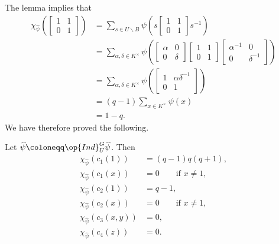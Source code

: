 \documentclass[../main.tex]{subfiles}
\begin{document}
The lemma implies that
\begin{align*}
	\chi_{\widehat\psi}\left(\begin{bmatrix}
		1 & 1 \\
		0 & 1
	\end{bmatrix}\right) &= \sum_{s\in U\backslash B}\psi\left(s\begin{bmatrix}
		1 & 1 \\
		0 & 1
	\end{bmatrix}s^{-1}\right) \\
	&= \sum_{\alpha,\delta\in K^\times}\psi\left(\begin{bmatrix}
		\alpha & 0 \\
		0 & \delta
	\end{bmatrix}\begin{bmatrix}
		1 & 1 \\
		0 & 1
	\end{bmatrix}\begin{bmatrix}
		\alpha^{-1} & 0 \\
		0 & \delta^{-1}
	\end{bmatrix}\right) \\
	&= \sum_{\alpha,\delta\in K^\times}\psi\left(\begin{bmatrix}
		1 & \alpha\delta^{-1} \\
		0 & 1
	\end{bmatrix}\right) \\
	&= (q-1)\sum_{x\in K^\times}\psi(x) \\
	&= 1-q.
\end{align*}
We have therefore proved the following.
\begin{theorem}
	Let $\widehat\psi\coloneqq\op{Ind}^G_U\widehat\psi$. Then
	\begin{align*}
		\chi_{\widehat\psi}(c_1(1)) &= (q-1)q(q+1), \\
		\chi_{\widehat\psi}(c_1(x)) &= 0 \qquad\text{if }x\ne1, \\
		\chi_{\widehat\psi}(c_2(1)) &= q-1, \\
		\chi_{\widehat\psi}(c_2(x)) &= 0 \qquad\text{if }x\ne1, \\
		\chi_{\widehat\psi}(c_3(x,y)) &= 0, \\
		\chi_{\widehat\psi}(c_4(z)) &= 0.
	\end{align*}
\end{theorem}
\end{document}
